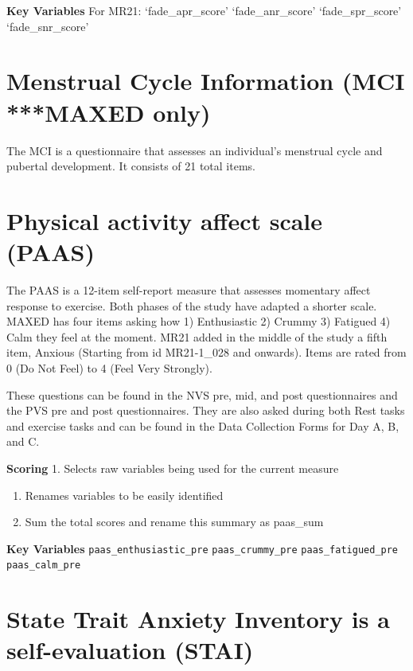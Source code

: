 \documentclass[
]{book}
\begin{document}
\textbf{Key Variables} For MR21: `fade\_apr\_score' `fade\_anr\_score'
`fade\_spr\_score' `fade\_snr\_score'

\section{Menstrual Cycle Information (MCI ***MAXED only)}\label{menstrual-cycle-information-mci-maxed-only}

The MCI is a questionnaire that assesses an individual's menstrual cycle
and pubertal development. It consists of 21 total items.

\section{Physical activity affect scale (PAAS)}\label{physical-activity-affect-scale-paas}

The PAAS is a 12-item self-report measure that assesses momentary affect
response to exercise. Both phases of the study have adapted a shorter
scale. MAXED has four items asking how 1) Enthusiastic 2) Crummy 3)
Fatigued 4) Calm they feel at the moment. MR21 added in the middle of
the study a fifth item, Anxious (Starting from id MR21-1\_028 and
onwards). Items are rated from 0 (Do Not Feel) to 4 (Feel Very
Strongly).

These questions can be found in the NVS pre, mid, and post
questionnaires and the PVS pre and post questionnaires. They are also
asked during both Rest tasks and exercise tasks and can be found in the
Data Collection Forms for Day A, B, and C.

\textbf{Scoring} 1. Selects raw variables being used for the current measure

\begin{enumerate}
\def\labelenumi{\arabic{enumi}.}
\setcounter{enumi}{1}
\item
  Renames variables to be easily identified
\item
  Sum the total scores and rename this summary as paas\_sum
\end{enumerate}

\textbf{Key Variables} \texttt{paas\_enthusiastic\_pre} \texttt{paas\_crummy\_pre}
\texttt{paas\_fatigued\_pre} \texttt{paas\_calm\_pre}

\section{State Trait Anxiety Inventory is a self-evaluation (STAI)}\label{state-trait-anxiety-inventory-is-a-self-evaluation-stai}
\end{document}

